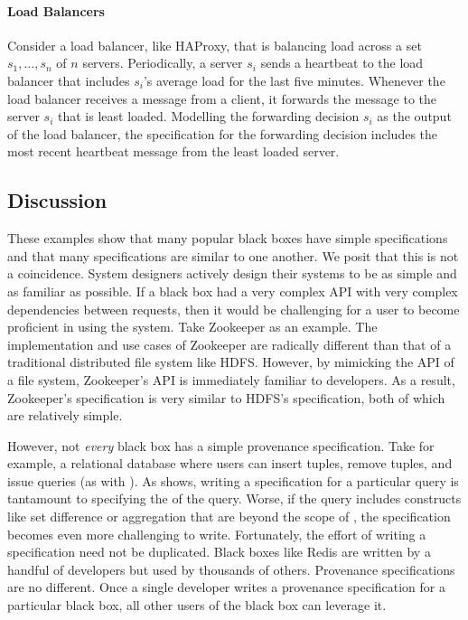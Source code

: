 \paragraph{Load Balancers}
Consider a load balancer, like HAProxy, that is balancing load across a set
$s_1, \ldots, s_n$ of $n$ servers. Periodically, a server $s_i$ sends a
heartbeat to the load balancer that includes $s_i$'s average load for the last
five minutes. Whenever the load balancer receives a message from a client, it
forwards the message to the server $s_i$ that is least loaded. Modelling the
forwarding decision $s_i$ as the output of the load balancer, the
\watprovenance{} specification for the forwarding decision includes the most
recent heartbeat message from the least loaded server.


\subsection{Discussion}
These examples show that many popular black boxes have simple \watprovenance{}
specifications and that many \watprovenance{} specifications are similar to one
another. We posit that this is not a coincidence. System designers actively
design their systems to be as simple and as familiar as possible. If a black
box had a very complex API with very complex dependencies between requests,
then it would be challenging for a user to become proficient in using the
system. Take Zookeeper as an example. The implementation and use cases of
Zookeeper are radically different than that of a traditional distributed file
system like HDFS. However, by mimicking the API of a file system, Zookeeper's
API is immediately familiar to developers. As a result, Zookeeper's
\watprovenance{} specification is very similar to HDFS's \watprovenance{}
specification, both of which are relatively simple.

However, not \emph{every} black box has a simple provenance specification. Take
for example, a relational database where users can insert tuples, remove
tuples, and issue queries (as with ). As
 shows, writing a \watprovenance{} specification for a
particular query is tantamount to specifying the \whyprovenance{} of the query.
Worse, if the query includes constructs like set difference or aggregation that
are beyond the scope of \whyprovenance{}, the \watprovenance{} specification
becomes even more challenging to write. Fortunately, the effort of writing a
\watprovenance{} specification need not be duplicated. Black boxes like Redis
are written by a handful of developers but used by thousands of others.
Provenance specifications are no different. Once a single developer writes a
provenance specification for a particular black box, all other users of the
black box can leverage it.

